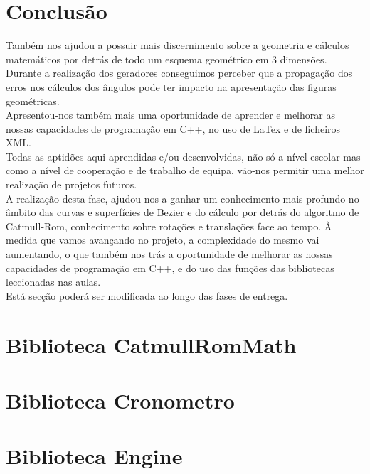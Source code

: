 \documentclass{article}
\begin{document}
\section{Conclusão}
Também nos ajudou a possuir mais discernimento sobre a geometria e cálculos matemáticos por detrás de todo um esquema geométrico em 3 dimensões.\\
Durante a realização dos geradores conseguimos perceber que a propagação dos erros nos cálculos dos ângulos pode ter impacto na apresentação das figuras geométricas.\\
Apresentou-nos também mais uma oportunidade de aprender e melhorar as nossas capacidades de programação em C++, no uso de LaTex e de ficheiros XML.\\
Todas as aptidões aqui aprendidas e/ou desenvolvidas, não só a nível escolar mas como a nível de cooperação e  de trabalho de equipa. vão-nos permitir uma melhor realização de projetos futuros.\\
A realização desta fase, ajudou-nos a ganhar um conhecimento mais profundo no âmbito das curvas e superfícies de Bezier e do cálculo por detrás do algoritmo de Catmull-Rom, conhecimento sobre rotações e translações face ao tempo. À medida que vamos avançando no projeto, a complexidade do mesmo vai aumentando, o que também nos trás a oportunidade de melhorar as nossas capacidades de programação em C++, e do uso das funções das bibliotecas leccionadas nas aulas.\\
Está secção poderá ser modificada ao longo das fases de entrega.\\

\newpage


\appendix

\section{Biblioteca CatmullRomMath}


\newpage

\section{Biblioteca Cronometro}


\newpage

\section{Biblioteca Engine}


\newpage
\end{document}
